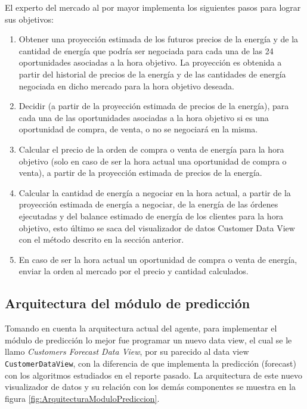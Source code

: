 El experto del mercado al por mayor implementa los siguientes pasos para lograr sus objetivos:

\renewcommand{\labelenumi}{\arabic{enumi}$)$}

\begin{enumerate}
	\item Obtener una proyección estimada de los futuros precios de la energía y de la cantidad de energía que podría ser negociada para cada una de las 24 oportunidades asociadas a la
hora objetivo. La proyección es obtenida a partir del historial de precios de la energía y
de las cantidades de energía negociada en dicho mercado para la hora objetivo deseada.
	\item Decidir (a partir de la proyección estimada de precios de la energía), para cada una de las oportunidades asociadas a la hora objetivo si es una oportunidad de compra, de venta, o
no se negociará en la misma.
	\item Calcular el precio de la orden de compra o venta de energía para la hora objetivo (solo en caso de ser la hora actual una oportunidad de compra o venta), a partir de la proyección estimada de precios de la energía.
	\item Calcular la cantidad de energía a negociar en la hora actual, a partir de la proyección estimada de energía a negociar, de la energía de las órdenes ejecutadas y del balance estimado de energía de los clientes para la hora objetivo, esto último se saca del visualizador de datos Customer Data View con el método descrito en la sección anterior.
	\item En caso de ser la hora actual un oportunidad de compra o venta de energía, enviar la
orden al mercado por el precio y cantidad calculados.
\end{enumerate}


\subsection{Arquitectura del módulo de predicción} \label{subsection:arquitecturaModuloPred}
Tomando en cuenta la arquitectura actual del agente, para implementar el módulo de predicción lo mejor fue programar un nuevo data view, el cual se le llamo \textit{Customers Forecast Data View}, por su parecido al data view  \texttt{CustomerDataView}, con la diferencia de que implementa la predicción (forecast) con los algoritmos estudiados en el reporte pasado. La arquitectura de este nuevo visualizador de datos y su relación con los demás componentes se muestra en la figura \ref{fig:ArquitecturaModuloPrediccion}.

